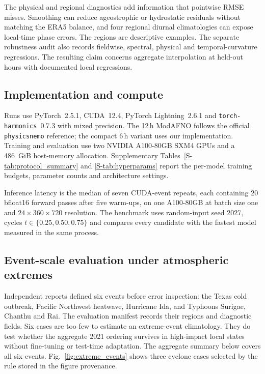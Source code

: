 \documentclass[referee,lineno,pdflatex,sn-nature]{sn-jnl}
\begin{document}
\begin{deferreddiscussion}
The physical and regional diagnostics add information that pointwise RMSE
misses. Smoothing can reduce ageostrophic or hydrostatic residuals without
matching the ERA5 balance, and four regional diurnal climatologies can expose
local-time phase errors. The regions are descriptive examples. The separate
robustness audit also records fieldwise, spectral, physical and
temporal-curvature regressions. The resulting claim concerns aggregate
interpolation at held-out hours with documented local regressions.

\end{deferreddiscussion}

\begin{deferredmethoddetails}
\subsection{Implementation and compute}
\label{app:impl}
Runs use PyTorch~2.5.1, CUDA~12.4, PyTorch Lightning~2.6.1 and
\texttt{torch-harmonics}~0.7.3 with mixed precision. The 12\,h ModAFNO follows
the official \texttt{physicsnemo} reference; the compact 6\,h variant uses our
implementation. Training and evaluation use two NVIDIA A100-80GB SXM4 GPUs
and a 486~GiB host-memory allocation. Supplementary
Tables~\ref{S-tab:protocol_summary} and \ref{S-tab:hyperparams} report the
per-model training budgets, parameter counts and architecture settings.

Inference latency is the median of seven CUDA-event repeats, each containing
20 bfloat16 forward passes after five warm-ups, on one A100-80GB at batch size
one and $24\times360\times720$ resolution. The benchmark uses random-input
seed 2027, cycles $t\in\{0.25,0.50,0.75\}$ and compares every candidate with
the fastest model measured in the same process.

\end{deferredmethoddetails}



\subsection{Event-scale evaluation under atmospheric extremes}
\label{sec:extreme_events}

Independent reports defined six events before error inspection: the Texas
cold outbreak, Pacific Northwest heatwave, Hurricane Ida, and Typhoons
Surigae, Chanthu and Rai. The evaluation manifest records their regions and
diagnostic fields. Six cases are too few to estimate an
extreme-event climatology. They do test whether the aggregate 2021 ordering
survives in high-impact local states without fine-tuning or test-time
adaptation. The aggregate summary below covers all six events.
Fig.~\ref{fig:extreme_events} shows three cyclone cases selected by the rule
stored in the figure provenance.
\end{document}
